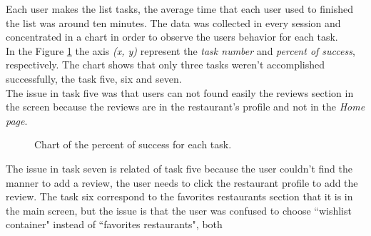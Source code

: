 Each user makes the list tasks, the average time that each user used
to finished the list was around ten minutes. The data was collected in
every session and concentrated in a chart in order to observe the users
behavior for each task. \\ In the Figure  \ref{fig:tsuccess} the axis 
\textit{(x, y)} represent the \textit{task number} and \textit{percent 
of success},  respectively. The chart shows that only
three tasks weren't accomplished successfully, the task five, six and seven. \\ 
The issue in task five was that users can not found easily the reviews
section in the screen because the reviews are in the restaurant's
profile and not in the \textit{Home page}. 
\begin{figure}
\centering
\captionsetup{font=footnotesize}
\caption{Chart of the percent of success for each task.}
\label{fig:tsuccess}   
\end{figure}
The issue in task seven is related of
task five because the user couldn't find the manner to add a review, the
user needs to click the restaurant profile to add the review. The task
six correspond to the favorites restaurants section that it is in the
main screen, but the issue is that the user was confused to choose
``wishlist container" instead  of  ``favorites restaurants", both 
